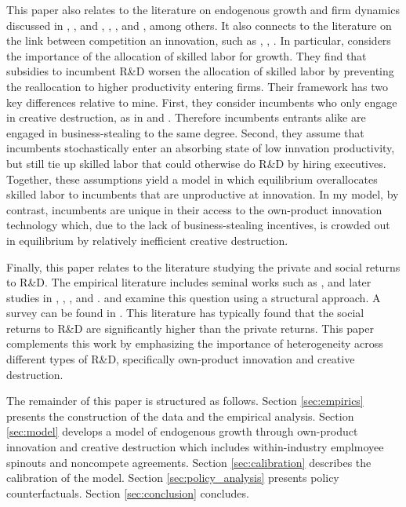 \documentclass[11pt,english]{article}
\theoremstyle{definition}
\begin{document}
This paper also relates to the literature on endogenous growth and firm dynamics discussed in \cite{romer_increasing_1986}, \cite{grossman_quality_1991}, and \cite{aghion_model_1992}, \cite{klette_innovating_2004}, \cite{lentz_empirical_2008}, and \cite{akcigit_growth_2018}, among others. It also connects to the literature on the link between competition an innovation, such as \cite{aghion_competition_2005}, \cite{acemoglu_innovation_2015}, \cite{aghion_theory_2019}. In particular, \cite{acemoglu_innovation_2018} considers the importance of the allocation of skilled labor for growth. They find that subsidies to incumbent R\&D worsen the allocation of skilled labor by preventing the reallocation to higher productivity entering firms. Their framework has two key differences relative to mine. First, they consider incumbents who only engage in creative destruction, as in \cite{klette_innovating_2004} and \cite{lentz_empirical_2008}. Therefore incumbents entrants alike are engaged in business-stealing to the same degree. Second, they assume that incumbents stochastically enter an absorbing state of low innvation productivity, but still tie up skilled labor that could otherwise do R\&D by hiring executives. Together, these assumptions yield a model in which equilibrium overallocates skilled labor to incumbents that are unproductive at innovation. In my model, by contrast, incumbents are unique in their access to the own-product innovation technology which, due to the lack of business-stealing incentives, is crowded out in equilibrium by relatively inefficient creative destruction.



Finally, this paper relates to the literature studying the private and social returns to R\&D. The empirical literature includes seminal works such as \cite{griliches_issues_1979}, \cite{griliches_search_1992} and later studies in \cite{bloom_identifying_2013}, \cite{harrison_does_2014}, \cite{mohnen_innovation_2013}, and \cite{doraszelski_rd_2013}. \cite{jones_measuring_1998} and \cite{comin_rd_2004} examine this question using a structural approach. A survey can be found in \cite{hall_chapter_2010}. This literature has typically found that the social returns to R\&D are significantly higher than the private returns. This paper complements this work by emphasizing the importance of heterogeneity across different types of R\&D, specifically own-product innovation and creative destruction.

The remainder of this paper is structured as follows. Section \ref{sec:empirics} presents the construction of the data and the empirical analysis. Section \ref{sec:model} develops a model of endogenous growth through own-product innovation and creative destruction which includes within-industry emplmoyee spinouts and noncompete agreements. Section \ref{sec:calibration} describes the calibration of the model. Section \ref{sec:policy_analysis} presents policy counterfactuals. Section \ref{sec:conclusion} concludes. 
\end{document}
